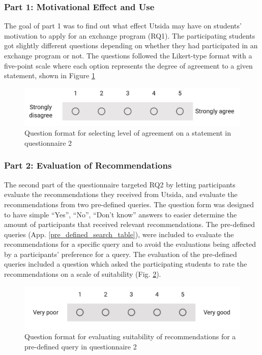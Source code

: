 \subsubsection{Part 1: Motivational Effect and Use}
The goal of part 1 was to find out what effect Utsida may have on students' motivation to apply for an exchange program (RQ1). The participating students got slightly different questions depending on whether they had participated in an exchange program or not. The questions followed the Likert-type format \cite{likert1932technique} with a five-point scale where each option represents the degree of agreement to a given statement, shown in Figure \ref{fig:q2_question_form}

\begin{figure}[H]
    \centering
    \includegraphics[width=1\textwidth]{fig/q2_question_form.png}
    \caption[Question format for selecting level of agreement on a statement]{Question format for selecting level of agreement on a statement in questionnaire 2}
    \label{fig:q2_question_form}
\end{figure}

\subsubsection{Part 2: Evaluation of Recommendations}

The second part of the questionnaire targeted RQ2 by letting participants evaluate the recommendations they received from Utsida, and evaluate the recommendations from two pre-defined queries. The question form was designed to have simple \enquote{Yes}, \enquote{No}, \enquote{Don't know} answers to easier determine the amount of participants that received relevant recommendations. The pre-defined queries (App. \ref{pre_defined_search_table}), were included to evaluate the recommendations for a specific query and to avoid the evaluations being affected by a participants' preference for a query. The evaluation of the pre-defined queries included a question which asked the participating students to rate the recommendations on a scale of suitability (Fig. \ref{fig:q2_rate_search}).

\begin{figure}[H]
    \centering
    \includegraphics[width=1\textwidth]{fig/rate_search.png}
    \caption[Question format for evaluating suitability of recommendations]{Question format for evaluating suitability of recommendations for a pre-defined query in questionnaire 2}
    \label{fig:q2_rate_search}
\end{figure}


